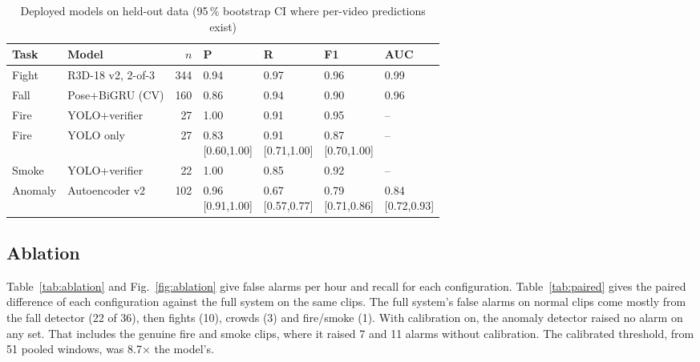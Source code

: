 \documentclass[conference]{IEEEtran}
\begin{document}
\begin{table}[t]
\caption{Deployed models on held-out data (95\,\% bootstrap CI where per-video predictions exist)}
\label{tab:models}
\centering
\footnotesize
\setlength{\tabcolsep}{3pt}
\begin{tabular}{llrllll}
\toprule
Task & Model & $n$ & P & R & F1 & AUC \\
\midrule
Fight & R3D-18 v2, 2-of-3 & 344 & 0.94 & 0.97 & 0.96 & 0.99 \\
Fall & Pose+BiGRU (CV) & 160 & 0.86 & 0.94 & 0.90 & 0.96 \\
Fire & YOLO+verifier & 27 & 1.00 & 0.91 & 0.95 & -- \\
Fire & YOLO only & 27 & \makecell[l]{0.83\\{}[0.60,1.00]} & \makecell[l]{0.91\\{}[0.71,1.00]} & \makecell[l]{0.87\\{}[0.70,1.00]} & -- \\
Smoke & YOLO+verifier & 22 & 1.00 & 0.85 & 0.92 & -- \\
Anomaly & Autoencoder v2 & 102 & \makecell[l]{0.96\\{}[0.91,1.00]} & \makecell[l]{0.67\\{}[0.57,0.77]} & \makecell[l]{0.79\\{}[0.71,0.86]} & \makecell[l]{0.84\\{}[0.72,0.93]} \\
\bottomrule
\end{tabular}
\end{table}

\subsection{Ablation}
Table~\ref{tab:ablation} and Fig.~\ref{fig:ablation} give false alarms per hour and recall for each configuration. Table~\ref{tab:paired} gives the paired difference of each configuration against the full system on the same clips. The full system's false alarms on normal clips come mostly from the fall detector (22 of 36), then fights (10), crowds (3) and fire/smoke (1). With calibration on, the anomaly detector raised no alarm on any set. That includes the genuine fire and smoke clips, where it raised 7 and 11 alarms without calibration. The calibrated threshold, from 51 pooled windows, was 8.7$\times$ the model's.
\end{document}
